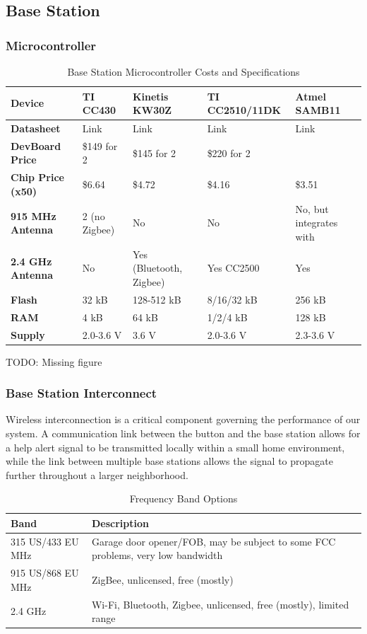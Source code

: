 \documentclass[journal,compsoc]{IEEEtran}
\begin{document}
\subsection{Base Station}

\subsubsection{Microcontroller}

\begin{table}[t]
  \centering
  \begin{tabular}{>{\bfseries}l|l l l l}
    Device & TI CC430 & Kinetis KW30Z & TI CC2510/11DK & Atmel SAMB11 \\
    \hline
    Datasheet & Link & Link & Link & Link \\
    DevBoard Price & \$149 for 2 & \$145 for 2 & \$220 for 2 & \\
    Chip Price (x50) & \$6.64 & \$4.72 & \$4.16 & \$3.51 \\
    915 MHz Antenna & 2 (no Zigbee) & No & No & No, but integrates with \\
    2.4 GHz Antenna & No & Yes (Bluetooth, Zigbee) & Yes CC2500 & Yes \\
    Flash & 32 kB & 128-512 kB & 8/16/32 kB & 256 kB \\
    RAM & 4 kB & 64 kB & 1/2/4 kB & 128 kB \\
    Supply & 2.0-3.6 V & 3.6 V & 2.0-3.6 V & 2.3-3.6 V
  \end{tabular}
  \caption{Base Station Microcontroller Costs and Specifications}
\end{table}

TODO: Missing figure

\subsubsection{Base Station Interconnect}

Wireless interconnection is a critical component governing the performance of our system.  A communication link between the button and the base station allows for a help alert signal to be transmitted locally within a small home environment, while the link between multiple base stations allows the signal to propagate further throughout a larger neighborhood.

\begin{table}[t]
  \centering
  \begin{tabular}{l|l}
    Band & Description \\
    \hline
    315 US/433 EU MHz & Garage door opener/FOB, may be subject to some FCC problems, very low bandwidth \\
    915 US/868 EU MHz & ZigBee, unlicensed, free (mostly) \\
    2.4 GHz & Wi-Fi, Bluetooth, Zigbee, unlicensed, free (mostly), limited range
  \end{tabular}
  \caption{Frequency Band Options}
\end{table}
\end{document}
